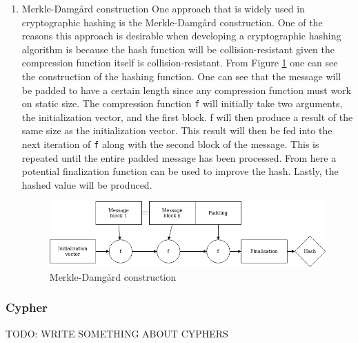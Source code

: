 \documentclass[a4paper]{article}
\begin{document}
\begin{enumerate}
\item Merkle-Damgård construction
\label{sec:org1d0e69a}
One approach that is widely used in cryptographic hashing is the Merkle-Damgård construction. One of the reasons this approach is desirable when developing a cryptographic hashing algorithm is because the hash function will be collision-resistant given the compression function itself is collision-resistant.
From Figure \ref{fig:Merkle} one can see the construction of the hashing function. One can see that the message will be padded to have a certain length since any compression function must work on static size. The compression function \texttt{f} will initially take two arguments, the initialization vector, and the first block. f will then produce a result of the same size as the initialization vector. This result will then be fed into the next iteration of \texttt{f} along with the second block of the message. This is repeated until the entire padded message has been processed. From here a potential finalization function can be used to improve the hash. Lastly, the hashed value will be produced.

\begin{figure}[htbp]
\centering
\includegraphics[width=.9\linewidth]{Background/merkle.png}
\caption{\label{fig:Merkle}Merkle-Damgård construction}
\end{figure}
\end{enumerate}
\subsubsection{Cypher}
\label{sec:org8430514}
TODO: WRITE SOMETHING ABOUT CYPHERS
\end{document}
